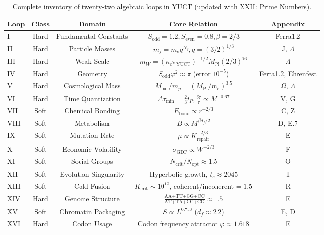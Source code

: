 \documentclass[12pt,a4paper]{article}
\begin{document}
	\begin{table}[htbp]
		\centering
		\caption{Complete inventory of twenty-two algebraic loops in YUCT (updated with XXII: Prime Numbers).}
		\label{tab:all-loops-22}
		\footnotesize
		\begin{tabular}{l c c c c}
			\toprule
			\textbf{Loop} & \textbf{Class} & \textbf{Domain} & \textbf{Core Relation} & \textbf{Appendix} \\
			\midrule
			I   & Hard & Fundamental Constants & \(S_{\mathrm{odd}}=1.2, S_{\mathrm{even}}=0.8, \beta=2/3\) & Ferra1.2 \\
			II  & Hard & Particle Masses & \(m_f = m_e q^{N_f}, q=(3/2)^{1/3}\) & J, \(\Lambda\) \\
			III & Hard & Weak Scale & \(m_W = (\kappa_c \pi_{\mathrm{YUCT}})^{-1/2} M_{\mathrm{Pl}} (2/3)^{96}\) & \(\Lambda\) \\
			IV  & Hard & Geometry & \(S_{\mathrm{odd}}\varphi^2 \approx \pi\) (error \(10^{-5}\)) & Ferra1.2, Ehrenfest \\
			V   & Hard & Cosmological Mass & \(M_{\mathrm{bar}}/m_p = (M_{\mathrm{Pl}}/m_e)^{3.5}\) & \(\Omega\), \(\Lambda\) \\
			VI  & Hard & Time Quantization & \(\Delta\tau_{\min} = \frac{2}{3}t_P, \frac{\delta\tau}{\tau} \propto M^{-0.67}\) & V, G \\
			VII & Soft & Chemical Bonding & \(E_{\mathrm{bond}} \propto r^{-2/3}\) & C, Z \\
			VIII& Soft & Metabolism & \(B \propto M^{\beta d_f/2}\) & D, E.7 \\
			IX  & Soft & Mutation Rate & \(\mu \propto K_{\mathrm{repair}}^{-2/3}\) & E \\
			X   & Soft & Economic Volatility & \(\sigma_{\mathrm{GDP}} \propto W^{-2/3}\) & F \\
			XI  & Soft & Social Groups & \(N_{\mathrm{crit}}/N_{\mathrm{opt}} \approx 1.5\) & O \\
			XII & Soft & Evolution Singularity & Hyperbolic growth, \(t_s \approx 2045\) & T \\
			XIII& Soft & Cold Fusion & \(K_{\mathrm{crit}} \sim 10^{12}\), coherent/incoherent = \(1.5\) & R \\
			XIV & Hard & Genome Structure & \(\frac{\text{AA+TT+GG+CC}}{\text{AT+TA+GC+CG}} \approx 1.5\) & E \\
			XV  & Soft & Chromatin Packaging & \(S \propto L^{0.733}\) (\(d_f \approx 2.2\)) & E, D \\
			XVI & Hard & Codon Usage & Codon frequency attractor \(\varphi \approx 1.618\) & E \\

\end{tabular}
\end{table}
\end{document}
